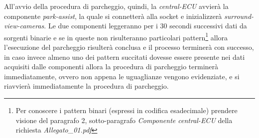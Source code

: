 \documentclass[11pt, openany]{article}
\theoremstyle{definition}
\theoremstyle{plain}
\theoremstyle{remark}
\begin{document}
			All'avvio della procedura di parcheggio, quindi, la \textit{central-ECU} avvierà la componente \textit{park-assist}, la quale si connetterà alla socket e inizializzerà \textit{surround-view-cameras}. Le due componenti leggeranno per i 30 secondi successivi dati da sorgenti binarie e se in queste non risulteranno particolari pattern\footnote{Per conoscere i pattern binari (espressi in codifica esadecimale) prendere visione del paragrafo 2, sotto-paragrafo \textit{Componente central-ECU} della richiesta \textit{Allegato\_01.pdf}} allora l'esecuzione del parcheggio risulterà conclusa e il processo terminerà con successo, in caso invece almeno uno dei pattern succitati dovesse essere presente nei dati acquisiti dalle componenti allora la procedura di parcheggio terminerà immediatamente, ovvero non appena le uguaglianze vengono evidenziate, e si riavvierà immediatamente la procedura di parcheggio.
\end{document}
